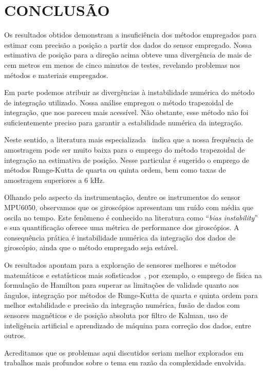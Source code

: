 \chapter*{CONCLUSÃO}\label{chap:conclusao}


Os resultados obtidos demonstram a insuficiência dos métodos empregados para estimar com precisão a posição a partir dos dados do sensor empregado. Nossa estimativa de posição para a direção acima obteve uma divergência de mais de cem metros em menos de cinco minutos de testes, revelando problemas nos métodos e materiais empregados.

Em parte podemos atribuir as divergências à instabilidade numérica do método de integração utilizado. Nossa análise empregou o método trapezoidal de integração, que nos pareceu mais acessível. Não obstante, esse método não foi suficientemente preciso para garantir a estabilidade numérica da integração.

Neste sentido, a literatura mais especializada~\cite{SAVAGE_2008} indica que a nossa frequência de amostragem pode ser muito baixa para o emprego do método trapezoidal de integração na estimativa de posição. Nesse particular é sugerido o emprego de métodos Runge-Kutta de quarta ou quinta ordem, bem como taxas de amostragem superiores a 6 kHz.

Olhando pelo aspecto da instrumentação, dentre os instrumentos do sensor MPU6050, observamos que os giroscópios apresentam um ruído com média que oscila no tempo. Este fenômeno é conhecido na literatura como ``\emph{bias instability}'' e sua quantificação oferece uma métrica de performance dos giroscópios. A consequência prática é instabilidade numérica da integração dos dados de giroscópio, ainda que o método empregado seja estável.

Os resultados apontam para a exploração de sensores melhores e métodos matemáticos e estatísticos mais sofisticados~\cite{SAVAGE_2008_2}, por exemplo, o emprego de física na formulação de Hamilton para superar as limitações de validade quanto aos ângulos, integração por métodos de Runge-Kutta de quarta e quinta ordem para melhor estabilidade e precisão da integração numérica, fusão de dados com sensores magnéticos e de posição absoluta por filtro de Kalman, uso de inteligência artificial e aprendizado de máquina para correção dos dados, entre outros.

Acreditamos que os problemas aqui discutidos seriam melhor explorados em trabalhos mais profundos sobre o tema em razão da complexidade envolvida.
